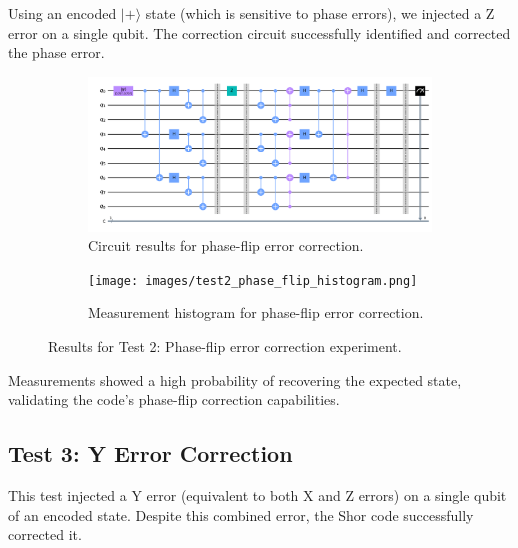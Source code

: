 \documentclass[12pt,a4paper]{article}
\begin{document}
Using an encoded $|+\rangle$ state (which is sensitive to phase errors), we injected a Z error on a single qubit. The correction circuit successfully identified and corrected the phase error.

\begin{figure}[H]
    \centering
    \begin{subfigure}[b]{0.49\textwidth}
        \includegraphics[width=\textwidth]{images/test2_phase_flip_correction.png}
        \caption{Circuit results for phase-flip error correction.}
    \end{subfigure}
    \hfill
    \begin{subfigure}[b]{0.49\textwidth}
        \texttt{[image: images/test2\_phase\_flip\_histogram.png]}
        \caption{Measurement histogram for phase-flip error correction.}
    \end{subfigure}
    \caption{Results for Test 2: Phase-flip error correction experiment.}
    \label{fig:phase_flip_results}
\end{figure}

Measurements showed a high probability of recovering the expected state, validating the code's phase-flip correction capabilities.

\subsection{Test 3: Y Error Correction}

This test injected a Y error (equivalent to both X and Z errors) on a single qubit of an encoded state. Despite this combined error, the Shor code successfully corrected it.
\end{document}
